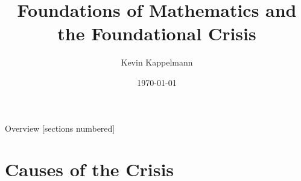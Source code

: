\documentclass{beamer}
\title{Foundations of Mathematics and the Foundational Crisis} %
\author{Kevin Kappelmann} %
\institute[TUM]{Technical University of Munich}
\date{\today} %
\begin{document}
\maketitle

\begin{frame}{Overview}
	[sections numbered]
	\tableofcontents
\end{frame}

\section{Causes of the Crisis}
\end{document}

